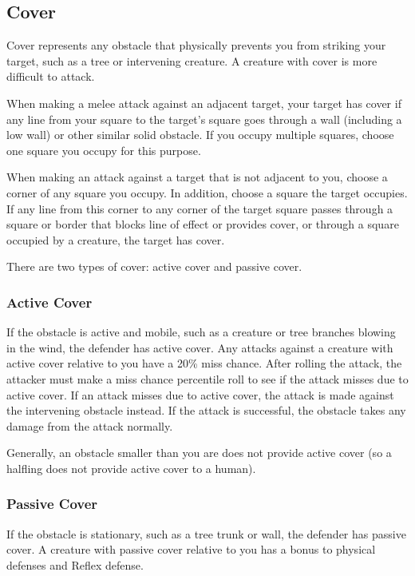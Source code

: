 \subsection{Cover}\label{Cover}

Cover represents any obstacle that physically prevents you from striking your target, such as a tree or intervening creature. A creature with cover is more difficult to attack.

 When making a melee attack against an adjacent target, your target has cover if any line from your square to the target's square goes through a wall (including a low wall) or other similar solid obstacle. If you occupy multiple squares, choose one square you occupy for this purpose.

When making an attack against a target that is not adjacent to you, choose a corner of any square you occupy. In addition, choose a square the target occupies. If any line from this corner to any corner of the target square passes through a square or border that blocks line of effect or provides cover, or through a square occupied by a creature, the target has cover.

There are two types of cover: active cover and passive cover.

\subsubsection{Active Cover}

If the obstacle is active and mobile, such as a creature or tree branches blowing in the wind, the defender has active cover. Any attacks against a creature with active cover relative to you have a 20\% miss chance. After rolling the attack, the attacker must make a miss chance percentile roll to see if the attack misses due to active cover. If an attack misses due to active cover, the attack is made against the intervening obstacle instead. If the attack is successful, the obstacle takes any damage from the attack normally. 

 Generally, an obstacle smaller than you are does not provide active cover (so a halfling does not provide active cover to a human). 

\subsubsection{Passive Cover}

If the obstacle is stationary, such as a tree trunk or wall, the defender has passive cover. A creature with passive cover relative to you has a  bonus to physical defenses and Reflex defense.

